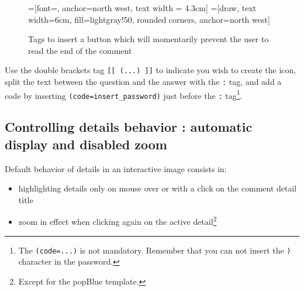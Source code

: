 \begin{figure}[htp!]
=[font=\sffamily, anchor=north west, text width = 4.3cm]
=[draw, text width=6cm, fill=lightgray!50, rounded corners, anchor=north west]
\caption{Tags to insert a button which will momentarily prevent the user to read the end of the comment}
\label{xia_answer_tags}
\end{figure}

Use the double brackets tag \texttt{[[ (...) ]]} to indicate you wish to create the icon, 
split the text between the question and the answer with the \texttt{:}
tag, and add a code by inserting \texttt{(code=insert\_password)} just before 
the \texttt{:} tag\footnote{The \texttt{(code={...})} is not mandatory. Remember 
that you can not insert the \texttt{)} character in the password.}.
  
\subsection{Controlling details behavior : automatic display and disabled zoom}\label{white_black_background}

Default behavior of details in an interactive image consists in:
\begin{itemize}
 \item highlighting details only on mouse over or with a click on the comment 
 detail title
 \item zoom in effect when clicking again on the active detail\footnote{Except 
 for the popBlue template.}
\end{itemize}

